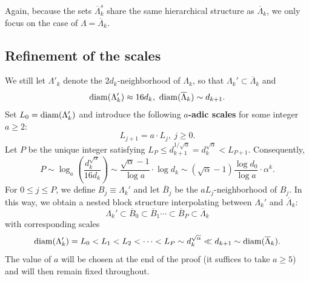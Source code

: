 \documentclass[11pt,reqno,UTF8,twoside]{amsart}
\newcommand{\barLambda}{\overline{\Lambda}}
\newcommand{\barB}{\overline{B}}
\newcommand{\diam}{{\rm diam}}
\theoremstyle{definition}
\numberwithin{equation}{section}
\begin{document}
Again, because the sets $\overline{\Lambda}_k^s$ share the same hierarchical structure as $\overline{\Lambda}_k$, we only focus on the case of $\Lambda = \overline{\Lambda}_k$. 



\subsection{Refinement of the scales}
We still let $\Lambda'_k$ denote the $2d_k$-neighborhood of $\Lambda_k$, so that $\Lambda_k'\subset \barLambda_k$ and 
\[\diam(\Lambda_k')\approx 16 d_k, \ \diam(\barLambda_k)\sim d_{k+1} .\]
Set $L_0=\diam(\Lambda_k')$ and introduce the following \textbf{$a$-adic scales} for some  integer $a\geq 2$: 
\begin{equation}\label{a-adic scale}
  L_{j+1}=a \cdot L_j, \ j\geq 0.
\end{equation}
Let $P$ be the unique integer satisfying $L_P\leq d_{k+1}^{1/ \sqrt{\alpha}}=d_{k}^{\sqrt{\alpha}} <L_{P+1}$. Consequently, 
\begin{equation}\label{P quantitive}
  P\sim \log_a  \left( \frac{d_k^{\sqrt{\alpha}}}{16 d_k}\right) \sim \frac{\sqrt{\alpha}-1}{\log a} \cdot \log d_k \sim   (\sqrt{\alpha}-1)\frac{\log d_0}{\log a} \cdot \alpha^k.
\end{equation} 
For $0\leq j \leq P$, we define $B_j\equiv \Lambda_k'$ and let $\overline{B}_j$ be the $a L_j$-neighborhood of $B_j$. In this way,  we obtain a nested block structure interpolating between $\Lambda_k'$ and $\barLambda_k$: 
\[\Lambda_k'\subset \barB_0\subset \barB_1\cdots \subset \barB_P\subset \barLambda_k \]
with corresponding scales 
\begin{equation}\label{interpolate a-adic scale}
  \diam(\Lambda_k') = L_0 <L_1<L_2<\cdots<L_P\sim d_k^{\sqrt{\alpha}}\ll d_{k+1}\sim \diam(\barLambda_k).
\end{equation}
The value of $a$ will be chosen at the end of the proof (it  suffices  to take $a \geq 5$) and will then remain fixed throughout.
\end{document}
